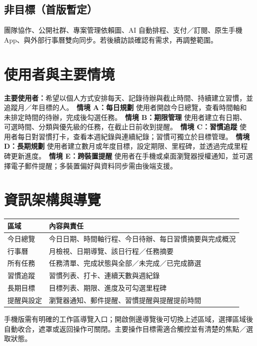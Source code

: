 \documentclass[12pt]{article}
\begin{document}
\subsection{非目標（首版暫定）}
團隊協作、公開社群、專案管理依賴圖、AI 自動排程、支付／訂閱、原生手機 App、與外部行事曆雙向同步。若後續訪談確認有需求，再調整範圍。
\section{使用者與主要情境}
\textbf{主要使用者：}希望以個人方式安排每天、記錄待辦與截止時間、持續建立習慣，並追蹤月／年目標的人。\
\textbf{情境 A：每日規劃} 使用者開啟今日總覽，查看時間軸和未排定時間的待辦，完成後勾選任務。\
\textbf{情境 B：期限管理} 使用者建立有日期、可選時間、分類與優先級的任務，在截止日前收到提醒。\
\textbf{情境 C：習慣追蹤} 使用者每日對習慣打卡，查看本週紀錄與連續紀錄；習慣可獨立於目標管理。\
\textbf{情境 D：長期規劃} 使用者建立數月或年度目標，設定期限、里程碑，並透過完成里程碑更新進度。\
\textbf{情境 E：跨裝置提醒} 使用者在手機或桌面瀏覽器授權通知，並可選擇電子郵件提醒；多裝置偏好與資料同步需由後端支援。
\section{資訊架構與導覽}
\begin{longtable}{p{3cm}p{10cm}}\toprule
區域 & 內容與責任\\\midrule
今日總覽 & 今日日期、時間軸行程、今日待辦、每日習慣摘要與完成概況\\
行事曆 & 月檢視、日期導覽、該日行程／任務摘要\\
所有任務 & 任務清單、完成狀態與全部／未完成／已完成篩選\\
習慣追蹤 & 習慣列表、打卡、連續天數與週紀錄\\
長期目標 & 目標列表、期限、進度及可勾選里程碑\\
提醒與設定 & 瀏覽器通知、郵件提醒、習慣提醒與提醒提前時間\\\bottomrule\end{longtable}
手機版需有明確的工作區導覽入口；開啟側邊導覽後可切換上述區域，選擇區域後自動收合，遮罩或返回操作可關閉。主要操作目標需適合觸控並有清楚的焦點／選取狀態。
\end{document}
